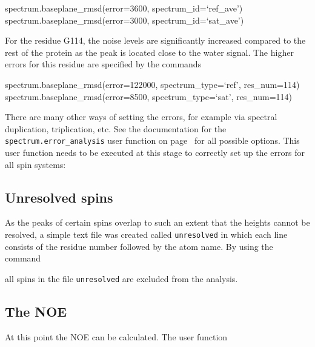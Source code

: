 \begin{exampleenv}
spectrum.baseplane\_rmsd(error=3600, spectrum\_id=`ref\_ave') \\
spectrum.baseplane\_rmsd(error=3000, spectrum\_id=`sat\_ave')
\end{exampleenv}

For the residue G114, the noise levels are significantly increased compared to the rest of the protein as the peak is located close to the water signal.  The higher errors for this residue are specified by the commands

\begin{exampleenv}
spectrum.baseplane\_rmsd(error=122000, spectrum\_type=`ref', res\_num=114) \\
spectrum.baseplane\_rmsd(error=8500, spectrum\_type=`sat', res\_num=114)
\end{exampleenv}

There are many other ways of setting the errors, for example via spectral duplication, triplication, etc.  See the documentation for the \texttt{spectrum.error\_analysis} user function on page~\pageref{uf: spectrum.error_analysis} for all possible options.  This user function needs to be executed at this stage to correctly set up the errors for all spin systems:




\subsection{Unresolved spins}

As the peaks of certain spins overlap to such an extent that the heights cannot be resolved, a simple text file was created called \texttt{unresolved} in which each line consists of the residue number followed by the atom name.  By using the command


all spins in the file \texttt{unresolved} are excluded from the analysis.




\subsection{The NOE}

At this point the NOE can be calculated.  The user function

